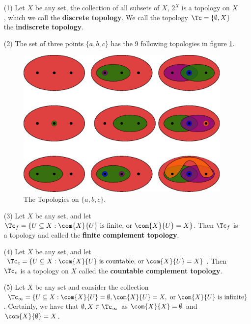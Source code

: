 \begin{example}
    \begin{enumerate}
        \item[(1)] Let $X$ be any set, the collection of all subsets of  $X$,
            $2^X$ is a topology on $X$, which we call the \textbf{discrete
            topology}. We call the topology $\Tc= \{\emptyset, X\}$ the
            \textbf{indiscrete topology}.

        \item[(2)] The set of three points $\{a, b, c\}$ has the  $9$ following
            topologies
            in figure \ref{fig1.1}.
            \begin{figure}[h]
                \centering
                \includegraphics[scale = 0.5]{Figures/Chapter1/three_point_topology.eps}
                \caption{The Topologies on $\{a, b, c\}$.}
                \label{fig1.1}
            \end{figure}

        \item[(3)] Let $X$ be any set, and let  $\Tc_f=\{U \subseteq X: \com{X}{U}
                \text{ is finite, or } \com{X}{U}=X\}$. Then  $\Tc_f$ is a
                topology and called the \textbf{finite complement topology}.

        \item[(4)] Let $X$ be any set, and let  $\Tc_c=\{U \subseteq X: \com{X}{U}
                \text{ is countable, or } \com{X}{U}=X\}$. Then  $\Tc_c$ is a
                topology on $X$ called the \textbf{countable complement
                topology}.

            \item[(5)] Let $X$ be any set and consider the collection
                $\Tc_\infty=\{U \subseteq X : \com{{X}}{U}=\emptyset,
                \com{X}{U}=X, \text{ or } \com{X}{U} \text{ is infinite}\}$.
                Certainly, we have that $\emptyset,X \in \Tc_\infty$ as
                $\com{X}{X}=\emptyset$ and $\com{X}{\emptyset}=X$.


\end{enumerate}
\end{example}
